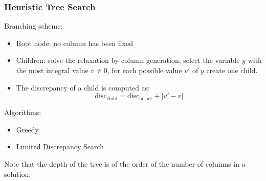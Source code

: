 \documentclass[10pt]{beamer}
\begin{document}
\begin{frame}
  \frametitle{Heuristic Tree Search}

  Branching scheme:
  \begin{itemize}
    \item Root node: no column has been fixed
    \item Children: solve the relaxation by column generation, select the variable $y$ with the most integral value $v \neq 0$, for each possible value $v'$ of $y$ create one child.
    \item The discrepancy of a child is computed as:
      \begin{displaymath}
        \mathrm{disc}_\text{child} = \mathrm{disc}_\text{father} + | v' - v |
      \end{displaymath}
  \end{itemize}

  Algorithms:
  \begin{itemize}
    \item Greedy
    \item Limited Discrepancy Search
  \end{itemize}

  Note that the depth of the tree is of the order of the number of columns in a solution.
\end{frame}
\end{document}
